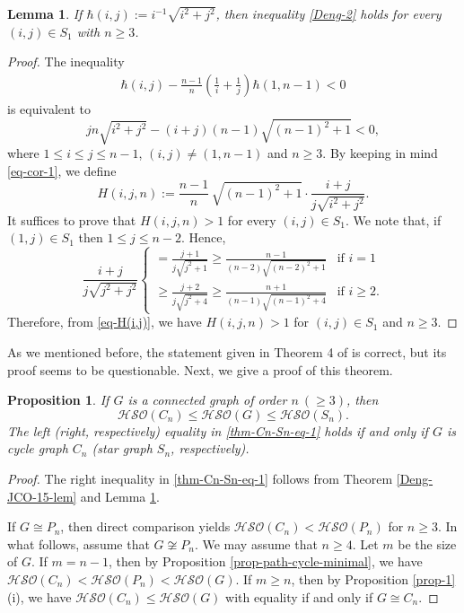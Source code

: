 \documentclass[12pt,a4paper]{article}
\newtheorem{proposition}{Proposition}[section]
\newtheorem{lemma}{Lemma}[section]
\begin{document}
\begin{lemma}\label{cor-Sn}
If  $\hbar(i,j):=i^{-1}\sqrt{i^2+j^2}$, then inequality \eqref{Deng-2} holds for every $(i, j) \in S_1$ with $n\ge3$.
\end{lemma}

\begin{proof}
The inequality
\begin{align*}
\hbar(i,j)-\frac{n-1}{n}\left(\frac{1}{i}+\frac{1}{j}\right) \hbar(1, n-1)<0
\end{align*}
is equivalent to
\begin{equation}\label{eq-cor-1}
jn\sqrt{i^2+j^2}-(i+j)(n-1)\sqrt{(n-1)^2+1}<0,
\end{equation}
where $1 \leq i \leq j \leq n-1 $, $(i, j)\ne (1, n-1)$ and $n\ge3$. By keeping in mind \eqref{eq-cor-1}, we define
\begin{equation}\label{eq-H(i,j)}
H(i,j,n):=\frac{n-1}{n}\,\sqrt{(n-1)^2+1}\cdot\frac{i+j}{j\sqrt{i^2+j^2}}.
\end{equation}
It suffices to prove that $H(i,j,n)> 1$ for every $(i, j) \in S_1$. We note that, if $(1, j) \in S_1$ then $1\le j\le n-2$.   Hence,
\[
\frac{i+j}{j\sqrt{j^2+j^2}}
\begin{cases}
=\displaystyle \frac{j+1}{j\sqrt{j^2+1}}\ge \frac{n-1}{(n-2)\sqrt{(n-2)^2+1}}  & \text{if $i=1$}\\[5mm]
\ge\displaystyle\frac{j+2}{j\sqrt{j^2+4}}\ge \frac{n+1}{(n-1)\sqrt{(n-1)^2+4}} & \text{if $i\ge2$.}
\end{cases}
\]
Therefore, from \eqref{eq-H(i,j)}, we have $H(i,j,n)>1$ for $(i,j)\in S_1$ and $n\ge3$.
\end{proof}


As we mentioned before, the statement given in Theorem 4 of \cite{Barman-MATCH-26} is correct, but its proof seems to be questionable.
Next, we give a proof of this theorem.

\begin{proposition}\label{thm-Cn-Sn}
If $G$ is a connected graph of order $n~(\ge3)$, then
\begin{equation}\label{thm-Cn-Sn-eq-1}
 \mathcal{HSO}(C_n) \le   \mathcal{HSO}(G) \le \mathcal{HSO}(S_n).
\end{equation}
The left (right, respectively) equality in \eqref{thm-Cn-Sn-eq-1} holds if and only if $G$ is cycle graph $C_n$ (star graph $S_n$, respectively).
\end{proposition}


\begin{proof}
The right inequality in \eqref{thm-Cn-Sn-eq-1} follows from Theorem \ref{Deng-JCO-15-lem} and Lemma \ref{cor-Sn}.


If $G \cong P_n$, then direct comparison yields $\mathcal{HSO}(C_n) <  \mathcal{HSO}(P_n)$ for $n\ge3$. In what follows, assume that $G \not\cong P_n$. We may assume that $n\ge4$. Let $m$ be the size of $G$. If $m=n-1$, then by Proposition \ref{prop-path-cycle-minimal}, we have $\mathcal{HSO}(C_n)<\mathcal{HSO}(P_n) <   \mathcal{HSO}(G)$. If $m\ge n$, then by Proposition \ref{prop-1}(i), we have $\mathcal{HSO}(C_n) \le   \mathcal{HSO}(G)$ with equality if and only if $G\cong C_n$.
\end{proof}
\end{document}
